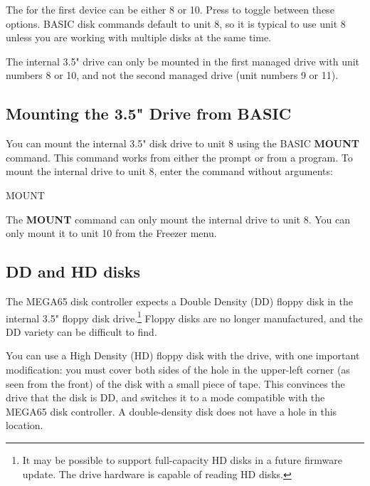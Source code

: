 The  for the first device can be either 8 or 10. Press  to toggle between these options. BASIC disk commands default to unit 8, so it is typical to use unit 8 unless you are working with multiple disks at the same time.

The internal 3.5" drive can only be mounted in the first managed drive with unit numbers 8 or 10, and not the second managed drive (unit numbers 9 or 11).

\subsection{Mounting the 3.5" Drive from BASIC}

You can mount the internal 3.5" disk drive to unit 8 using the BASIC {\bf MOUNT} command. This command works from either the  prompt or from a program. To mount the internal drive to unit 8, enter the command without arguments:

\begin{screencode}
MOUNT
\end{screencode}

The {\bf MOUNT} command can only mount the internal drive to unit 8. You can only mount it to unit 10 from the Freezer menu.

\subsection{DD and HD disks}

The MEGA65 disk controller expects a Double Density (DD) floppy disk in the internal 3.5" floppy disk drive.\footnote{It may be possible to support full-capacity HD disks in a future firmware update. The drive hardware is capable of reading HD disks.} Floppy disks are no longer manufactured, and the DD variety can be difficult to find.

You can use a High Density (HD) floppy disk with the drive, with one important modification: you must cover both sides of the hole in the upper-left corner (as seen from the front) of the disk with a small piece of tape. This convinces the drive that the disk is DD, and switches it to a mode compatible with the MEGA65 disk controller. A double-density disk does not have a hole in this location.

